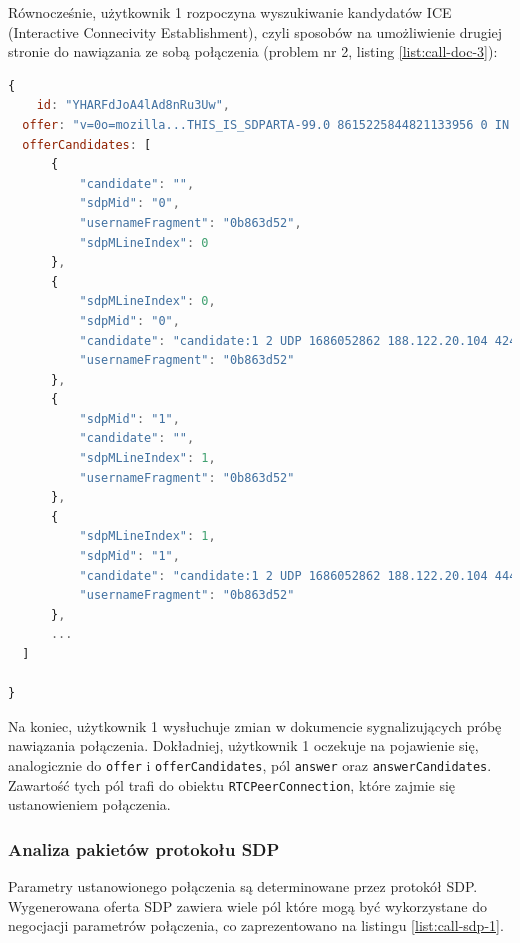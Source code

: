 Równocześnie, użytkownik 1 rozpoczyna wyszukiwanie kandydatów ICE (Interactive Connecivity Establishment), czyli
sposobów na umożliwienie drugiej stronie do nawiązania ze sobą połączenia (problem nr 2, listing \ref{list:call-doc-3}):

\begin{lstlisting}[language=Javascript,label=list:call-doc-3, caption=Dokument połączenia po dodaniu kandydatów ICE,
basicstyle=\footnotesize \ttfamily, showtabs=true, tabsize=4]
{
    id: "YHARFdJoA4lAd8nRu3Uw",
  offer: "v=0o=mozilla...THIS_IS_SDPARTA-99.0 8615225844821133956 0 IN IP4 0.0.0.0s=-t=0 0a=fingerprint:sha-256 5F:A8:8A:A5:B8:1D:0C:39:21:93:FA:3A:B2:B7:B6:3F:EF:8A:5D:3C:6E:86:2E:A7:0A:D4:F0:E3:58:E0:E2:7B...",
  offerCandidates: [
      {
          "candidate": "",
          "sdpMid": "0",
          "usernameFragment": "0b863d52",
          "sdpMLineIndex": 0
      },
      {
          "sdpMLineIndex": 0,
          "sdpMid": "0",
          "candidate": "candidate:1 2 UDP 1686052862 188.122.20.104 42436 typ srflx raddr 192.168.1.2 rport 42436",
          "usernameFragment": "0b863d52"
      },
      {
          "sdpMid": "1",
          "candidate": "",
          "sdpMLineIndex": 1,
          "usernameFragment": "0b863d52"
      },
      {
          "sdpMLineIndex": 1,
          "sdpMid": "1",
          "candidate": "candidate:1 2 UDP 1686052862 188.122.20.104 44466 typ srflx raddr 192.168.1.2 rport 44466",
          "usernameFragment": "0b863d52"
      },
      ...
  ]

}
\end{lstlisting}

Na koniec, użytkownik 1 wysłuchuje zmian w dokumencie sygnalizujących próbę nawiązania połączenia.
Dokładniej, użytkownik 1 oczekuje na pojawienie się, analogicznie do \verb|offer| i
\verb|offerCandidates|, pól \verb|answer| oraz \verb|answerCandidates|. Zawartość tych pól trafi do
obiektu \verb|RTCPeerConnection|, które zajmie się ustanowieniem połączenia.


\subsubsection{Analiza pakietów protokołu SDP}

Parametry ustanowionego połączenia są determinowane przez protokół SDP. Wygenerowana oferta SDP
zawiera wiele pól które mogą być wykorzystane do negocjacji parametrów połączenia, co zaprezentowano
na listingu \ref{list:call-sdp-1}.

